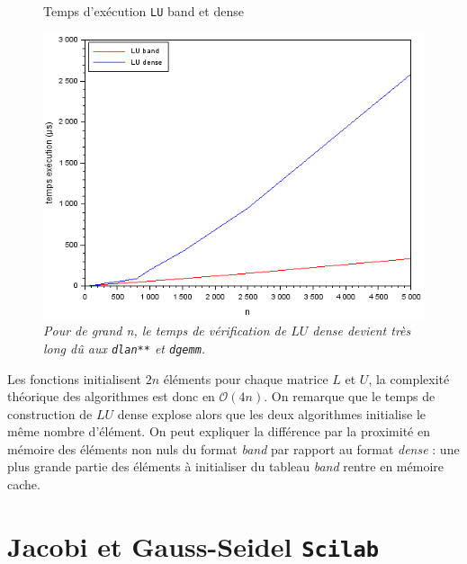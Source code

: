\documentclass{article}
\begin{document}
\begin{figure}[H]
\caption{Temps d'exécution \texttt{LU} band et dense}
\centering
\includegraphics[scale=0.70]{time_lu_band_dense}
\caption*{\textit{Pour de grand n, le temps de vérification de $LU$ \textit{dense} devient très long dû aux \texttt{dlan**} et \texttt{dgemm}.}}
\end{figure}
Les fonctions initialisent $2n$ éléments pour chaque matrice $L$ et $U$, la complexité théorique des algorithmes est donc en \(\mathcal{O}(4n)\).
On remarque que le temps de construction de $LU$ dense explose alors que les deux algorithmes initialise le même nombre d'élément. On peut expliquer la différence par la proximité en mémoire des éléments non nuls du format \textit{band} par rapport au format \textit{dense} : une plus grande partie des éléments à initialiser du tableau \textit{band} rentre en mémoire cache.

\section{Jacobi et Gauss-Seidel \texttt{Scilab}}
\end{document}
